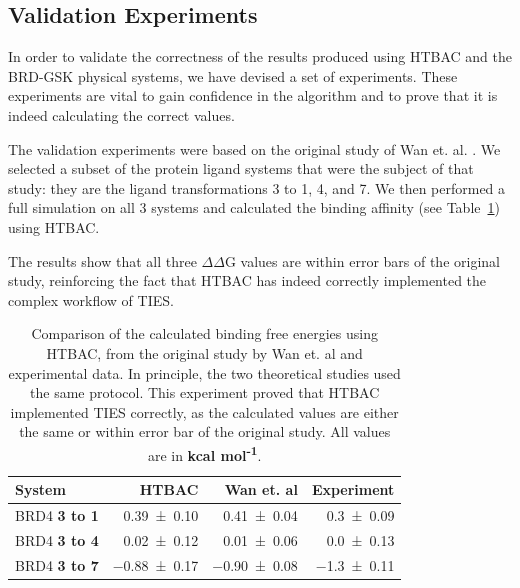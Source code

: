 \subsection{Validation Experiments}



In order to validate the correctness of the results produced using 
HTBAC and the BRD-GSK physical systems, we have devised
a set of experiments. These experiments are vital to gain confidence in the
algorithm and to prove that it is indeed calculating the correct values.

The validation experiments were based on the original study of Wan et. al.
\cite{Wan2017brd4}. We selected a subset of the protein ligand systems that
were the subject of that study: they are the ligand transformations 3 to 1,
4, and 7. We then performed a full simulation on all 3 systems and calculated
the binding affinity (see Table~\ref{tab:exp2}) using HTBAC.

The results show that all three $\Delta \Delta$G values are within error bars
of the original study, reinforcing the fact that HTBAC has indeed correctly
implemented the complex workflow of TIES.

\begin{table}
  \centering
  \caption{Comparison of the calculated binding free energies using HTBAC,
  from the original study by Wan et. al and experimental data. In principle,
  the two theoretical studies used the same protocol. This experiment proved
  that HTBAC implemented TIES correctly, as the calculated values are either
  the same or within error bar of the original study. All values are in
  \textbf{kcal mol\textsuperscript{-1}}.}
  \begin{tabular}{lrrr}
    \toprule
    System & HTBAC & Wan et. al & Experiment \\
    \midrule
    BRD4 \textbf{3 to 1} & \num{0.39 +- 0.10} &   \num{0.41 +- 0.04} &  \num{0.3 +- 0.09} \\
    BRD4 \textbf{3 to 4} & \num{0.02 +- 0.12} &   \num{0.01 +- 0.06} &  \num{0.0 +- 0.13} \\
    BRD4 \textbf{3 to 7} & \num{-0.88 +- 0.17} &  \num{-0.90 +- 0.08} & \num{-1.3 +- 0.11} \\
    \bottomrule
  \end{tabular}
  \label{tab:exp2}
\end{table}

